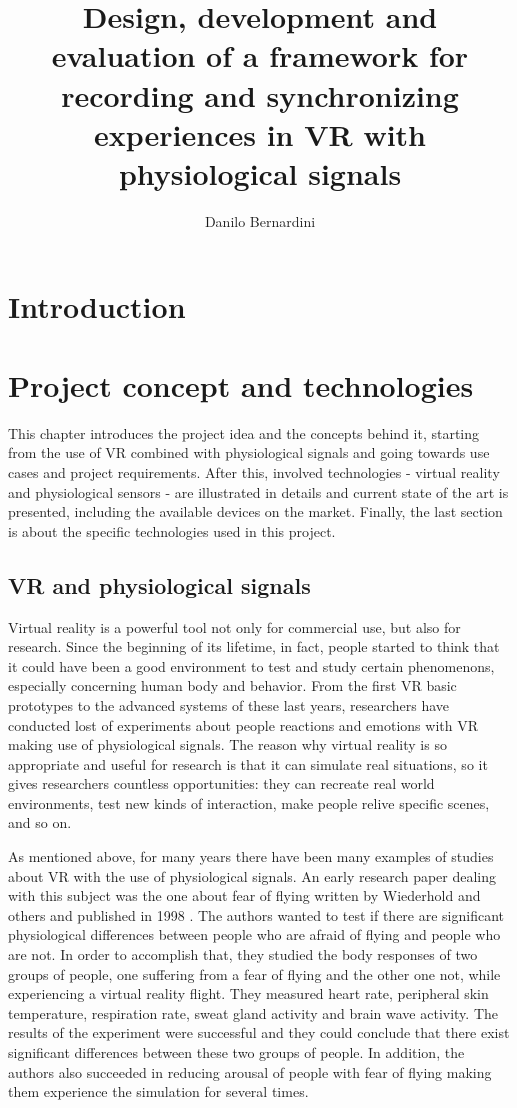 \documentclass[binding=0.6cm,LaM]{sapthesis}
\title{Design, development and evaluation of a framework for recording and synchronizing experiences in VR with physiological signals}
\author{Danilo Bernardini}
\begin{document}
\frontmatter
\maketitle
\tableofcontents
\mainmatter
\chapter{Introduction}



\chapter{Project concept and technologies}

This chapter introduces the project idea and the concepts behind it, starting from the use of VR combined with physiological signals and going towards use cases and project requirements. After this, involved technologies - virtual reality and physiological sensors - are illustrated in details and current state of the art is presented, including the available devices on the market. Finally, the last section is about the specific technologies used in this project.

\section{VR and physiological signals}
Virtual reality is a powerful tool not only for commercial use, but also for research. Since the beginning of its lifetime, in fact, people started to think that it could have been a good environment to test and study certain phenomenons, especially concerning human body and behavior. From the first VR basic prototypes to the advanced systems of these last years, researchers have conducted lost of experiments about people reactions and emotions with VR making use of physiological signals. The reason why virtual reality is so appropriate and useful for research is that it can simulate real situations, so it gives researchers countless opportunities: they can recreate real world environments, test new kinds of interaction, make people relive specific scenes, and so on. 

As mentioned above, for many years there have been many examples of studies about VR with the use of physiological signals. An early research paper dealing with this subject was the one about fear of flying written by Wiederhold and others and published in 1998 \cite{wiederhold1998fear}. The authors wanted to test if there are significant physiological differences between people who are afraid of flying and people who are not. In order to accomplish that, they studied the body responses of two groups of people, one suffering from a fear of flying and the other one not, while experiencing a virtual reality flight. They measured heart rate, peripheral skin temperature, respiration rate, sweat gland activity and brain wave activity. The results of the experiment were successful and they could conclude that there exist significant differences between these two groups of people. In addition, the authors also succeeded in reducing arousal of people with fear of flying making them experience the simulation for several times. 
\end{document}
